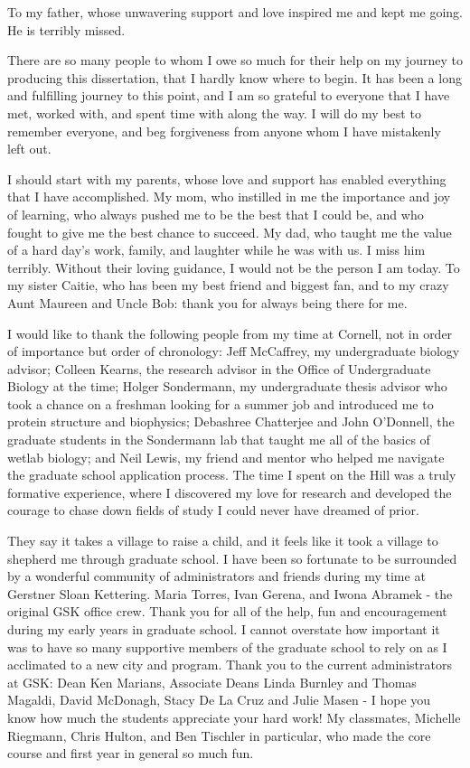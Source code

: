 \documentclass[phd,tocprelim]{cornell}
\begin{document}
\begin{dedication}
To my father, whose unwavering support and love inspired me and kept me going. He is terribly missed. 
\end{dedication}

\begin{acknowledgements}
There are so many people to whom I owe so much for their help on my journey to producing this dissertation, that I hardly know where to begin. It has been a long and fulfilling journey to this point, and I am so grateful to everyone that I have met, worked with, and spent time with along the way. I will do my best to remember everyone, and beg forgiveness from anyone whom I have mistakenly left out. 

I should start with my parents, whose love and support has enabled everything that I have accomplished. My mom, who instilled in me the importance and joy of learning, who always pushed me to be the best that I could be, and who fought to give me the best chance to succeed. My dad, who taught me the value of a hard day's work, family, and laughter while he was with us. I miss him terribly. Without their loving guidance, I would not be the person I am today. To my sister Caitie, who has been my best friend and biggest fan, and to my crazy Aunt Maureen and Uncle Bob: thank you for always being there for me. 

I would like to thank the following people from my time at Cornell, not in order of importance but order of chronology: Jeff McCaffrey, my undergraduate biology advisor; Colleen Kearns, the research advisor in the Office of Undergraduate Biology at the time; Holger Sondermann, my undergraduate thesis advisor who took a chance on a freshman looking for a summer job and introduced me to protein structure and biophysics; Debashree Chatterjee and John O'Donnell, the graduate students in the Sondermann lab that taught me all of the basics of wetlab biology; and Neil Lewis, my friend and mentor who helped me navigate the graduate school application process. The time I spent on the Hill was a truly formative experience, where I discovered my love for research and developed the courage to chase down fields of study I could never have dreamed of prior. 

They say it takes a village to raise a child, and it feels like it took a village to shepherd me through graduate school. I have been so fortunate to be surrounded by a wonderful community of administrators and friends during my time at Gerstner Sloan Kettering. Maria Torres, Ivan Gerena, and Iwona Abramek - the original GSK office crew. Thank you for all of the help, fun and encouragement during my early years in graduate school. I cannot overstate how important it was to have so many supportive members of the graduate school to rely on as I acclimated to a new city and program. Thank you to the current administrators at GSK: Dean Ken Marians, Associate Deans Linda Burnley and Thomas Magaldi, David McDonagh, Stacy De La Cruz and Julie Masen - I hope you know how much the students appreciate your hard work!  My classmates, Michelle Riegmann, Chris Hulton, and Ben Tischler in particular, who made the core course and first year in general so much fun. 


\end{acknowledgements}
\end{document}
